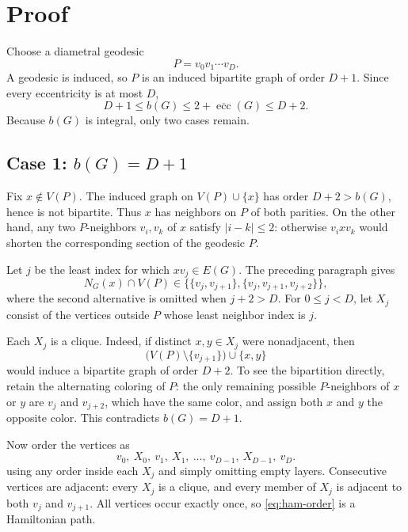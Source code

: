 \documentclass[10pt]{article}
\theoremstyle{paperplain}
\newcommand{\ecc}{\operatorname{ecc}}
\begin{document}
\clearpage
\section{Proof}

Choose a diametral geodesic
\[
                         P=v_0v_1\cdots v_D .
\]
A geodesic is induced, so \(P\) is an induced bipartite graph of order
\(D+1\).  Since every eccentricity is at most \(D\),
\begin{equation}
       D+1\leq b(G)
       \leq 2+\overline{\ecc}(G)
       \leq D+2.
\label{eq:chain}
\end{equation}
Because \(b(G)\) is integral, only two cases remain.

\subsection*{Case 1: \(b(G)=D+1\)}

Fix \(x\notin V(P)\).  The induced graph on \(V(P)\cup\{x\}\) has
order \(D+2>b(G)\), hence is not bipartite.  Thus \(x\) has neighbors
on \(P\) of both parities.  On the other hand, any two \(P\)-neighbors
\(v_i,v_k\) of \(x\) satisfy \(|i-k|\leq2\): otherwise
\(v_i x v_k\) would shorten the corresponding section of the
geodesic \(P\).

Let \(j\) be the least index for which \(xv_j\in E(G)\).  The preceding
paragraph gives
\begin{equation}
       N_G(x)\cap V(P)
       \in\bigl\{\{v_j,v_{j+1}\},
                   \{v_j,v_{j+1},v_{j+2}\}\bigr\},
\label{eq:attachment}
\end{equation}
where the second alternative is omitted when \(j+2>D\).  For
\(0\leq j<D\), let \(X_j\) consist of the vertices outside \(P\) whose
least neighbor index is \(j\).

Each \(X_j\) is a clique.  Indeed, if distinct \(x,y\in X_j\) were
nonadjacent, then
\[
       \bigl(V(P)\setminus\{v_{j+1}\}\bigr)\cup\{x,y\}
\]
would induce a bipartite graph of order \(D+2\).  To see the
bipartition directly, retain the alternating coloring of \(P\):
the only remaining possible \(P\)-neighbors of \(x\) or \(y\) are
\(v_j\) and \(v_{j+2}\), which have the same color, and assign both
\(x\) and \(y\) the opposite color.  This contradicts \(b(G)=D+1\).

Now order the vertices as
\begin{equation}
            v_0,\ X_0,\ v_1,\ X_1,\ \ldots,\
            v_{D-1},\ X_{D-1},\ v_D.
\label{eq:ham-order}
\end{equation}
using any order inside each \(X_j\) and simply omitting empty layers.
Consecutive vertices are adjacent: every \(X_j\) is a clique, and
every member of \(X_j\) is adjacent to both \(v_j\) and \(v_{j+1}\).
All vertices occur exactly once, so \eqref{eq:ham-order} is a Hamiltonian
path.
\end{document}
